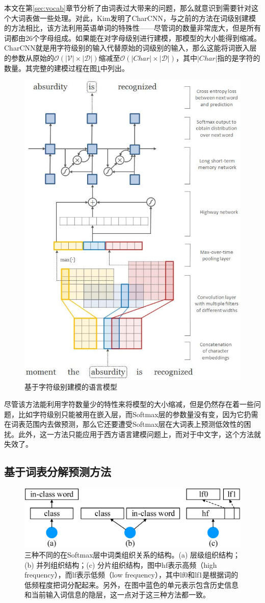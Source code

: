 \documentclass[12pt,a4paper]{article}
\begin{document}
本文在第\ref{sec:vocab}章节分析了由词表过大带来的问题，那么就意识到需要针对这个大词表做一些处理。对此，Kim发明了CharCNN\cite{DBLP:conf/aaai/KimJSR16}，与之前的方法在词级别建模的方法相比，该方法利用英语单词的特殊性——尽管词的数量非常庞大，但是所有词都由26个字母组成。如果能在对字母级别进行建模，那模型的大小能得到缩减。CharCNN就是用字符级别的输入代替原始的词级别的输入，那么这能将词嵌入层的参数从原始的${\mathcal{O}(|\mathcal{V}| \times |\mathcal{D}|)}$缩减至${\mathcal{O}(|Char| \times |\mathcal{D}|)}$，其中${|Char|}$指的是字符的数量。其完整的建模过程在图\ref{fig:charcnn}中列出。
\begin{figure}[hb]
  \centering
  \includegraphics[width=0.4\linewidth]{./figures/CharCNN.jpg}
  \caption{基于字符级别建模的语言模型}\label{fig:charcnn}
\end{figure}
尽管该方法能利用字符数量少的特性来将模型的大小缩减，但是仍然存在着一些问题，比如字符级别只能被用在嵌入层，而Softmax层的参数量没有变，因为它扔需在词表范围内去做预测，那么它还要遭受Softmax层在大词表上预测低效性的困扰。此外，这一方法只能应用于西方语言建模问题上，而对于中文字，这个方法就失效了。

\subsection{基于词表分解预测方法}
\label{sec:vocab_facto}
\begin{figure}[b]
  \centering
  \includegraphics[width=0.65\columnwidth]{./figures/softmax3.png}
  \caption{三种不同的在Softmax层中词类组织关系的结构。(a) 层级组织结构；(b) 并列组织结构；(c) 分片组织结构，图中hf表示高频（high frequency），而lf表示低频（low frequency），其中lf0和lf1是根据词的低频程度把词分配起来。另外，在图中蓝色的单元表示包含历史信息和当前输入词信息的隐层，这一点对于这三种方法都一致。}
  \label{fig:softmax}
\end{figure}
\end{document}
